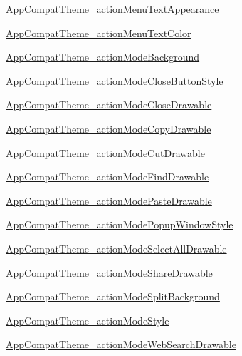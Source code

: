 \begin{Desc}
\hyperlink{classandroid_1_1support_1_1v4_1_1_r_1_1styleable_5430afc19e0b78b7dc7aee394d785df7}{AppCompatTheme\_\-actionMenuTextAppearance} 

\hyperlink{classandroid_1_1support_1_1v4_1_1_r_1_1styleable_7c5193ab46252c56ec1b49d531de7e9d}{AppCompatTheme\_\-actionMenuTextColor} 

\hyperlink{classandroid_1_1support_1_1v4_1_1_r_1_1styleable_f70d7a35bb0b3c72eebdf5c561070a1d}{AppCompatTheme\_\-actionModeBackground} 

\hyperlink{classandroid_1_1support_1_1v4_1_1_r_1_1styleable_cdb6ed50e0449f44c75352a5178b4674}{AppCompatTheme\_\-actionModeCloseButtonStyle} 

\hyperlink{classandroid_1_1support_1_1v4_1_1_r_1_1styleable_b09f6cbf2975e5f044f4db1c3f5be82e}{AppCompatTheme\_\-actionModeCloseDrawable} 

\hyperlink{classandroid_1_1support_1_1v4_1_1_r_1_1styleable_6efcfd6f29a1ed5f1e115d527ad02db2}{AppCompatTheme\_\-actionModeCopyDrawable} 

\hyperlink{classandroid_1_1support_1_1v4_1_1_r_1_1styleable_ff9fdface004857501db9de7aedb1dd6}{AppCompatTheme\_\-actionModeCutDrawable} 

\hyperlink{classandroid_1_1support_1_1v4_1_1_r_1_1styleable_4c89f9a8ad7b10afd63ffd919b6c656d}{AppCompatTheme\_\-actionModeFindDrawable} 

\hyperlink{classandroid_1_1support_1_1v4_1_1_r_1_1styleable_ce113ab232516420cf074243bfe9453f}{AppCompatTheme\_\-actionModePasteDrawable} 

\hyperlink{classandroid_1_1support_1_1v4_1_1_r_1_1styleable_bcdd14cc5abf52a599a9a9d79cd848bd}{AppCompatTheme\_\-actionModePopupWindowStyle} 

\hyperlink{classandroid_1_1support_1_1v4_1_1_r_1_1styleable_161a3ac1577d6c574603d52de21d3d13}{AppCompatTheme\_\-actionModeSelectAllDrawable} 

\hyperlink{classandroid_1_1support_1_1v4_1_1_r_1_1styleable_5d3af33e63914f57419c77e882cafd0c}{AppCompatTheme\_\-actionModeShareDrawable} 

\hyperlink{classandroid_1_1support_1_1v4_1_1_r_1_1styleable_5e9c280564e789966ff3d14b724504a1}{AppCompatTheme\_\-actionModeSplitBackground} 

\hyperlink{classandroid_1_1support_1_1v4_1_1_r_1_1styleable_7b9d118860f9039d760ed5c14bc0d23c}{AppCompatTheme\_\-actionModeStyle} 

\hyperlink{classandroid_1_1support_1_1v4_1_1_r_1_1styleable_bfa14a297ea509f8f84881a8e67711b1}{AppCompatTheme\_\-actionModeWebSearchDrawable} 


\end{Desc}
